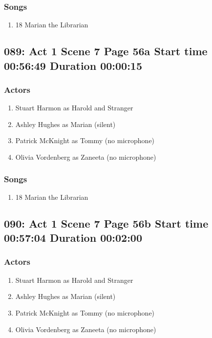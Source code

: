 \subsubsection{Songs}
\begin{enumerate}
\item 18 Marian the Librarian
\end{enumerate}
\subsection{089: Act 1 Scene 7 Page 56a Start time 00:56:49 Duration 00:00:15}

\subsubsection{Actors}
\begin{enumerate}
\item Stuart Harmon as Harold and Stranger
\item Ashley Hughes as Marian (silent)
\item Patrick McKnight as Tommy (no microphone)
\item Olivia Vordenberg as Zaneeta (no microphone)
\end{enumerate}

\subsubsection{Songs}
\begin{enumerate}
\item 18 Marian the Librarian
\end{enumerate}
\subsection{090: Act 1 Scene 7 Page 56b Start time 00:57:04 Duration 00:02:00}

\subsubsection{Actors}
\begin{enumerate}
\item Stuart Harmon as Harold and Stranger
\item Ashley Hughes as Marian (silent)
\item Patrick McKnight as Tommy (no microphone)
\item Olivia Vordenberg as Zaneeta (no microphone)
\end{enumerate}

